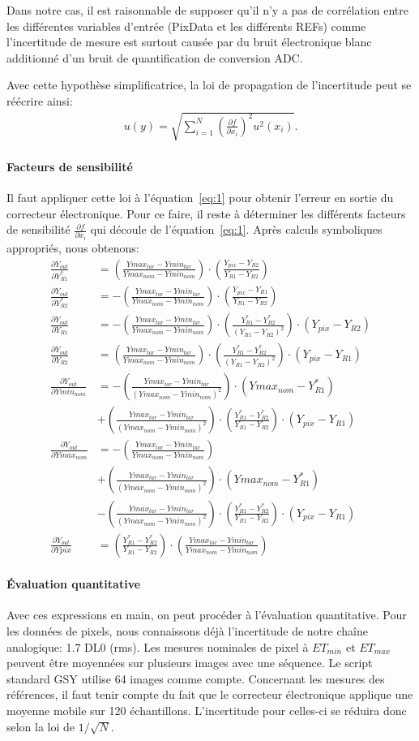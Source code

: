 \documentclass[11pt]{report}
\newcommand{\pd}[2]{\frac{\partial{#1}}{\partial{#2}}}
\newcommand{\fone}{\left(\frac{Y_{R1}^*-Y_{R2}^*}{Y_{R1}-Y_{R2}}\right)}
\newcommand{\ftwo}{\left(\frac{Ymax_{tar}-Ymin_{tar}}{Ymax_{nom}-Ymin_{nom}}\right)}
\newcommand{\fthree}{\left(\frac{Y_{R1}^*-Y_{R2}^*}{(Y_{R1}-Y_{R2})^2}\right)}
\newcommand{\ffour}{\left(\frac{Ymax_{tar}-Ymin_{tar}}{(Ymax_{nom}-Ymin_{nom})^2}\right)}
\newcommand{\sfone}{\pd{Y_{out}}{Y_{R1}^*}}
\newcommand{\sftwo}{\pd{Y_{out}}{Y_{R2}^*}}
\newcommand{\sfthree}{\pd{Y_{out}}{Y_{R1}}}
\newcommand{\sffour}{\pd{Y_{out}}{Y_{R2}}}
\newcommand{\sffive}{\pd{Y_{out}}{Ymin_{nom}}}
\newcommand{\sfsix}{\pd{Y_{out}}{Ymax_{nom}}}
\newcommand{\sfseven}{\pd{Y_{out}}{Y{pix}}}
\begin{document}
Dans notre cas, il est raisonnable de supposer qu'il n'y a pas de corrélation entre les différentes variables d'entrée (PixData et les différents REFs) comme l'incertitude de mesure est surtout causée par du bruit électronique blanc additionné d'un bruit de quantification de conversion ADC.

Avec cette hypothèse simplificatrice, la loi de propagation de l'incertitude peut se réécrire ainsi:
\begin{align}
u(y)=\sqrt{\sum_{i=1}^N \left(\pd{f}{x_i}\right)^2 u^2(x_i)}.
\label{eq:2}
\end{align}

\paragraph{Facteurs de sensibilité}
Il faut appliquer cette loi à l'équation~\eqref{eq:1} pour obtenir l'erreur en sortie du correcteur électronique. Pour ce faire, il reste à déterminer les différents facteurs de sensibilité $\pd{f}{x_i}$ qui découle de l'équation~\eqref{eq:1}. Après calculs symboliques appropriés, nous obtenons:
\begin{align*}
\sfone &= \ftwo\cdot\left(\frac{Y_{pix}-Y_{R2}}{Y_{R1}-Y_{R2}}\right)\\
\sftwo &= -\ftwo\cdot\left(\frac{Y_{pix}-Y_{R1}}{Y_{R1}-Y_{R2}}\right)\\
\sfthree &= -\ftwo\cdot\fthree\cdot(Y_{pix}-Y_{R2})\\
\sffour &= \ftwo\cdot\fthree\cdot(Y_{pix}-Y_{R1})\\
\sffive &= -\ffour\cdot(Ymax_{nom}-Y_{R1}^*)\\
		&+\ffour\cdot\fone\cdot(Y_{pix}-Y_{R1})\\
\sfsix &= -\ftwo\\
       &+ \ffour\cdot(Ymax_{nom}-Y_{R1}^*)\\
       &- \ffour\cdot\fone\cdot(Y_{pix}-Y_{R1})\\
\sfseven &= \fone\cdot\ftwo
\end{align*}

\paragraph{Évaluation quantitative}
Avec ces expressions en main, on peut procéder à l'évaluation quantitative. Pour les données de pixels, nous connaissons déjà l'incertitude de notre chaîne analogique: 1.7 DL0 (rms). Les mesures nominales de pixel à $ET_{min}$ et $ET_{max}$ peuvent être moyennées sur plusieurs images avec une séquence. Le script standard GSY utilise 64 images comme compte. Concernant les mesures des références, il faut tenir compte du fait que le correcteur électronique applique une moyenne mobile sur 120 échantillons. L'incertitude pour celles-ci se réduira donc selon la loi de $1/\sqrt{N}$.
\end{document}
